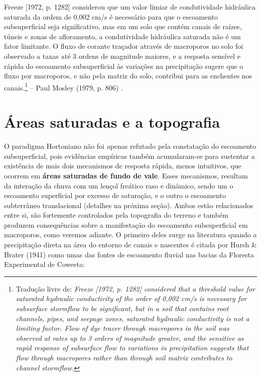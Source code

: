 \documentclass[./main.tex]{subfiles}
\begin{document}
\begin{adjustwidth}{100pt}{0pt}
\medskip
\small Freeze [1972, p. 1282] considerou que um valor limiar de condutividade hidráulica saturada da ordem de 0,002 cm/s é necessário para que o escoamento subsuperficial seja significativo, mas em um solo que contém canais de raízes, túneis e zonas de afloramento, a condutividade hidráulica saturada não é um fator limitante. O fluxo de corante traçador através de macroporos no solo foi observado a taxas até 3 ordens de magnitude maiores, e a resposta sensível e rápida do escoamento subsuperficial às variações na precipitação sugere que o fluxo por macroporos, e não pela matriz do solo, contribui para as enchentes nos canais.\footnote{Tradução livre de: \textit{Freeze [1972, p. 1282] considered that a threshold value for saturated hydraulic conductivity of the order of 0,002 cm/s is necessary for subsurface stormflow to be significant, but in a soil that contains root channels, pipes, and seepage zones, saturated hydraulic conductivity is not a limiting factor. Flow of dye tracer through macropores in the soil was observed at rates up to 3 orders of magnitude greater, and the sensitive as rapid response of subsurface flow to variations in precipitation suggests that flow through macropores rather than through soil matrix contributes to channel stormflow.}} -- Paul Mosley (1979, p. 806) \cite{Mosley1979}.
\medskip
\end{adjustwidth}

\section{Áreas saturadas e a topografia}


\par O paradigma Hortoniano não foi apenas refutado pela constatação do escoamento subsuperficial, pois evidências empíricas também acumularam-se para sustentar a existência de mais dois mecanismos de resposta rápida, menos intuitivos, que ocorrem em \textbf{áreas saturadas de fundo de vale}. Esses mecanismos, resultam da interação da chuva com um lençol freático raso e dinâmico, sendo um o escoamento superficial por excesso de saturação, e o outro o escoamento subterrâneo translacional (detalhes na próxima seção). Ambos estão relacionados entre si, são fortemente controlados pela topografia do terreno e também produzem consequências sobre a manifestação do escoamento subsuperficial em macroporos, como veremos adiante. O primeiro deles surge na literatura quando a precipitação direta na área do entorno de canais e nascentes é citada por Hursh \& Brater (1941) \cite{Hursh1941} como umas das fontes de escoamento fluvial nas bacias da Floresta Experimental de Coweeta:   
\end{document}
